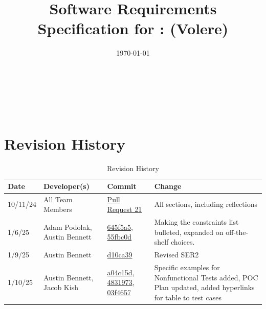 \documentclass[12pt]{article}
\begin{document}
\title{Software Requirements Specification for \progname: (Volere)} 
\author{\authname}
\date{\today}
	
\maketitle

~\newpage


\tableofcontents

~\newpage

\section*{Revision History}

\begin{table}[H]
\centering
\caption{Revision History}
\label{TblRevisionHistory}
\begin{tabularx}{\textwidth}{p{} p{} p{} p{}}
\toprule
\textbf{Date} & \textbf{Developer(s)} & \textbf{Commit} & \textbf{Change}\\

\midrule
10/11/24 & 
All Team Members & 
\href{https://github.com/ausbennett/mes-finance-platform/pull/21}{Pull Request 21} & 
All sections, including reflections\\

\midrule
1/6/25 & 
Adam Podolak, Austin Bennett & 
\href{https://github.com/ausbennett/mes-finance-platform/commit/645f5a5ecfee7cc2adbb784888d733d815d3080f}{645f5a5}, \href{https://github.com/ausbennett/mes-finance-platform/commit/55fbc0d26a10b56f90c50919de7a8c9ca920ec11}{55fbc0d}  & Making the constraints list bulleted, expanded on off-the-shelf choices. \\

\midrule
1/9/25 & 
Austin Bennett & 
\href{https://github.com/ausbennett/mes-finance-platform/commit/d10ca390135f3c6f5a7b2c8f237c3575501a2a7f}{d10ca39} & 
Revised SER2\\

\midrule
1/10/25 & 
Austin Bennett, Jacob Kish & 
\href{https://github.com/ausbennett/mes-finance-platform/commit/a04c15d0b1c09c4224c563c3293413720992000f}{a04c15d}, 
\href{https://github.com/ausbennett/mes-finance-platform/commit/4831973b5533e5ae9d6ae4e884bd0cfebb49792d}{4831973},
\href{https://github.com/ausbennett/mes-finance-platform/commit/03f46579d128fbf9c896b3c4cba2601181f4d5c1}{03f4657} & 
Specific examples for Nonfunctional Tests added, POC Plan updated, added hyperlinks for table to test cases\\


\end{tabularx}
\end{table}
\end{document}
